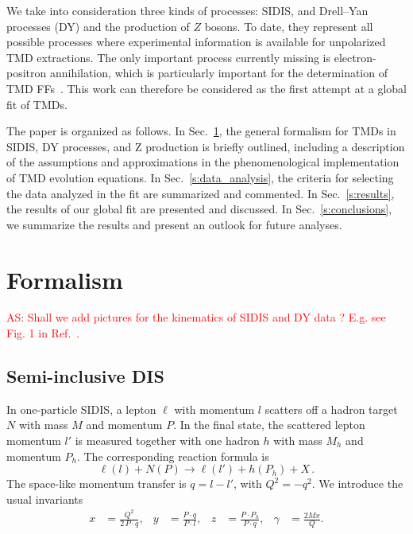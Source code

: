 \documentclass[aps,preprintnumbers,showpacs,nofootinbib,superscriptaddress,floatfix]{revtex4}
\begin{document}
We take into consideration three kinds of processes: SIDIS, and
Drell--Yan processes (DY) and the production of $Z$
bosons. To date, they represent 
all possible processes
  where experimental information is available for unpolarized TMD
  extractions. 
The only important
process currently missing is electron-positron annihilation, which is
particularly important for the determination of TMD
FFs~\cite{Bacchetta:2015ora}. This work can therefore be considered as the
first attempt at a global fit of TMDs.  

The paper is organized as follows. In Sec.~\ref{s:theory}, the general
formalism for TMDs in SIDIS, DY processes, and Z production is briefly outlined, including a
description of the assumptions and approximations in the phenomenological
implementation of TMD evolution equations. In Sec.~\ref{s:data_analysis}, the criteria
for selecting the data analyzed in the fit are summarized and commented. In
Sec.~\ref{s:results}, the results of our global fit are presented and
discussed. In Sec.~\ref{s:conclusions}, we summarize the results and present an outlook for future analyses. 
   

\section{Formalism}
\label{s:theory}

\textcolor{red}{AS: Shall we add pictures for the kinematics of SIDIS and DY data ? E.g. see Fig. 1 in Ref.~\cite{Signori:2013mda}.}

\subsection{Semi-inclusive DIS}
\label{ss:SIDIS_formalism}

In one-particle SIDIS, a lepton $\ell$ with momentum $l$ scatters 
off a hadron target $N$ with mass $M$ and momentum
$P$. In the final state, the scattered lepton momentum 
$l'$ is measured together with
one hadron $h$ with mass $M_h$
and momentum $P_h$. The corresponding reaction formula is  
\begin{equation}
  \label{e:sidis}
\ell(l) + N(P) \to \ell(l') + h(P_h) + X \, .
\end{equation}
The space-like momentum transfer is $q = l - l'$, with $Q^2 = - q^2$. We
introduce the usual invariants  
\begin{align}
  \label{e:xyz}
x &= \frac{Q^2}{2\,P\cdot q},
&
y &= \frac{P \cdot q}{P \cdot l},
&
z &= \frac{P \cdot P_h}{P\cdot q},
&
\gamma &= \frac{2 M x}{Q} .
\end{align}
\end{document}
